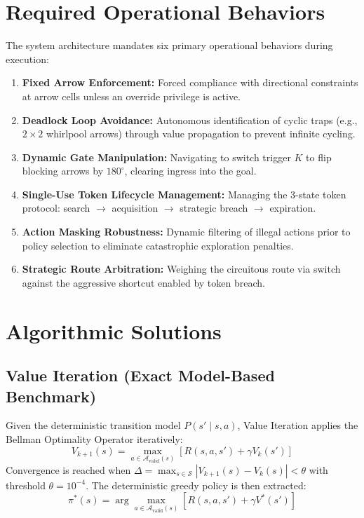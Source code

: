 \documentclass[conference]{IEEEtran}
\begin{document}
\section{Required Operational Behaviors}
The system architecture mandates six primary operational behaviors during execution:
\begin{enumerate}
    \item \textbf{Fixed Arrow Enforcement:} Forced compliance with directional constraints at arrow cells unless an override privilege is active.
    \item \textbf{Deadlock Loop Avoidance:} Autonomous identification of cyclic traps (e.g., $2 \times 2$ whirlpool arrows) through value propagation to prevent infinite cycling.
    \item \textbf{Dynamic Gate Manipulation:} Navigating to switch trigger $K$ to flip blocking arrows by $180^\circ$, clearing ingress into the goal.
    \item \textbf{Single-Use Token Lifecycle Management:} Managing the 3-state token protocol: search $\to$ acquisition $\to$ strategic breach $\to$ expiration.
    \item \textbf{Action Masking Robustness:} Dynamic filtering of illegal actions prior to policy selection to eliminate catastrophic exploration penalties.
    \item \textbf{Strategic Route Arbitration:} Weighing the circuitous route via switch against the aggressive shortcut enabled by token breach.
\end{enumerate}

\section{Algorithmic Solutions}

\subsection{Value Iteration (Exact Model-Based Benchmark)}
Given the deterministic transition model $P(s' \mid s, a)$, Value Iteration applies the Bellman Optimality Operator iteratively:
\begin{equation}
V_{k+1}(s) = \max_{a \in \mathcal{A}_{\text{valid}}(s)} \left[ R(s, a, s') + \gamma V_k(s') \right]
\label{eq:bellman}
\end{equation}
Convergence is reached when $\Delta = \max_{s \in \mathcal{S}} |V_{k+1}(s) - V_k(s)| < \theta$ with threshold $\theta = 10^{-4}$. The deterministic greedy policy is then extracted:
\begin{equation}
\pi^*(s) = \arg\max_{a \in \mathcal{A}_{\text{valid}}(s)} \left[ R(s, a, s') + \gamma V^*(s') \right]
\end{equation}
\end{document}
